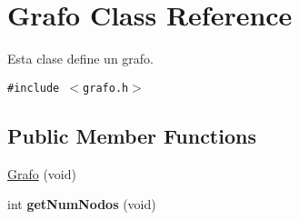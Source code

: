 \hypertarget{classGrafo}{
\section{Grafo Class Reference}
\label{classGrafo}
}
Esta clase define un grafo.  


{\tt \#include $<$grafo.h$>$}

\subsection*{Public Member Functions}
\begin{CompactItemize}
\item 
\hyperlink{classGrafo_7b86c2cd9e014eaf972dcd4d2e780c48}{Grafo} (void)
\item 
\hypertarget{classGrafo_d1fbc03a4e7ebdde73c0c474fffcc451}{
int \textbf{getNumNodos} (void)}
\label{classGrafo_d1fbc03a4e7ebdde73c0c474fffcc451}


\end{CompactItemize}
